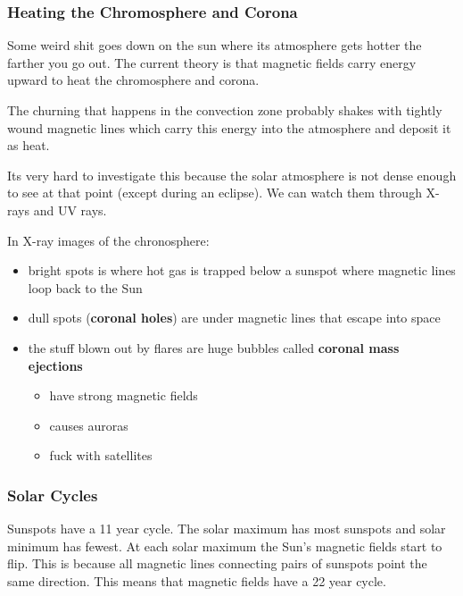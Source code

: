 \subsubsection{Heating the Chromosphere and Corona}
Some weird shit goes down on the sun where its atmosphere gets hotter the farther you go out. The current theory is that magnetic fields carry energy upward to heat the chromosphere and corona.

The churning that happens in the convection zone probably shakes with tightly wound magnetic lines which carry this energy into the atmosphere and deposit it as heat.

Its very hard to investigate this because the solar atmosphere is not dense enough to see at that point (except during an eclipse). We can watch them through X-rays and UV rays.

In X-ray images of the chronosphere:
\begin{itemize}
\item bright spots is where hot gas is trapped below a sunspot where magnetic lines loop back to the Sun
\item dull spots (\textbf{coronal holes}) are under magnetic lines that escape into space
\item the stuff blown out by flares are huge bubbles called \textbf{coronal mass ejections}
\begin{itemize}
\item have strong magnetic fields
\item causes auroras
\item fuck with satellites
\end{itemize}
\end{itemize}

\subsubsection{Solar Cycles}
Sunspots have a 11 year cycle. The solar maximum has most sunspots and solar minimum has fewest. At each solar maximum the Sun's magnetic fields start to flip. This is because all magnetic lines connecting pairs of sunspots point the same direction. This means that magnetic fields have a 22 year cycle.
